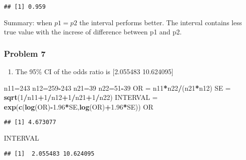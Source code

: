 \documentclass[]{article}
\newenvironment{Shaded}{\begin{snugshade}}{\end{snugshade}}
\newcommand{\KeywordTok}[1]{\textcolor[rgb]{0.13,0.29,0.53}{\textbf{#1}}}
\newcommand{\DecValTok}[1]{\textcolor[rgb]{0.00,0.00,0.81}{#1}}
\newcommand{\FloatTok}[1]{\textcolor[rgb]{0.00,0.00,0.81}{#1}}
\newcommand{\StringTok}[1]{\textcolor[rgb]{0.31,0.60,0.02}{#1}}
\newcommand{\OperatorTok}[1]{\textcolor[rgb]{0.81,0.36,0.00}{\textbf{#1}}}
\newcommand{\NormalTok}[1]{#1}
\providecommand{\tightlist}{%
  \setlength{\itemsep}{0pt}\setlength{\parskip}{0pt}}
\begin{document}
\begin{verbatim}
## [1] 0.959
\end{verbatim}

Summary: when \(p1 = p2\) the interval performs better. The interval
contains less true value with the increse of difference between p1 and
p2.

\subsubsection{Problem 7}\label{problem-7}

\begin{enumerate}
\def\labelenumi{\alph{enumi}.}
\tightlist
\item
  The 95\% CI of the odds ratio is {[}2.055483 10.624095{]}
\end{enumerate}

\begin{Shaded}
\begin{Highlighting}[]
\NormalTok{n11=}\DecValTok{243}
\NormalTok{n12=}\DecValTok{259}\OperatorTok{-}\DecValTok{243}
\NormalTok{n21=}\DecValTok{39}
\NormalTok{n22=}\DecValTok{51}\OperatorTok{-}\DecValTok{39}
\NormalTok{OR =}\StringTok{ }\NormalTok{n11}\OperatorTok{*}\NormalTok{n22}\OperatorTok{/}\NormalTok{(n21}\OperatorTok{*}\NormalTok{n12)}
\NormalTok{SE =}\StringTok{ }\KeywordTok{sqrt}\NormalTok{(}\DecValTok{1}\OperatorTok{/}\NormalTok{n11}\OperatorTok{+}\DecValTok{1}\OperatorTok{/}\NormalTok{n12}\OperatorTok{+}\DecValTok{1}\OperatorTok{/}\NormalTok{n21}\OperatorTok{+}\DecValTok{1}\OperatorTok{/}\NormalTok{n22)}
\NormalTok{INTERVAL =}\StringTok{ }\KeywordTok{exp}\NormalTok{(}\KeywordTok{c}\NormalTok{(}\KeywordTok{log}\NormalTok{(OR)}\OperatorTok{-}\FloatTok{1.96}\OperatorTok{*}\NormalTok{SE,}\KeywordTok{log}\NormalTok{(OR)}\OperatorTok{+}\FloatTok{1.96}\OperatorTok{*}\NormalTok{SE))}
\NormalTok{OR}
\end{Highlighting}
\end{Shaded}

\begin{verbatim}
## [1] 4.673077
\end{verbatim}

\begin{Shaded}
\begin{Highlighting}[]
\NormalTok{INTERVAL}
\end{Highlighting}
\end{Shaded}

\begin{verbatim}
## [1]  2.055483 10.624095
\end{verbatim}
\end{document}
